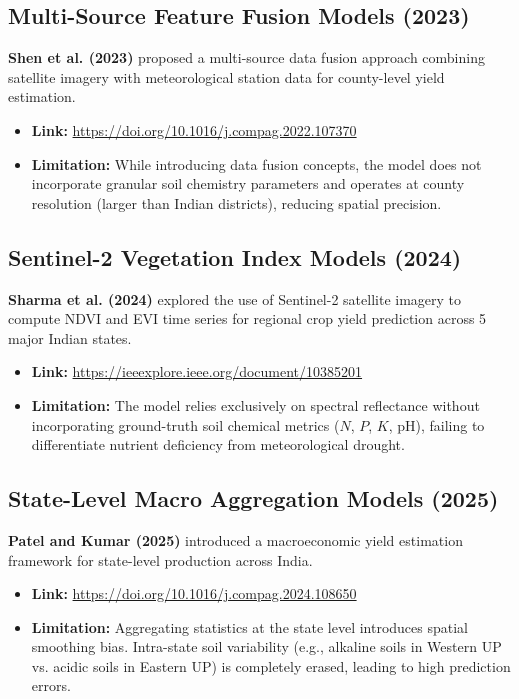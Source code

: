 \documentclass[11pt,a4paper]{article}
\begin{document}
\subsection{Multi-Source Feature Fusion Models (2023)}
\textbf{Shen et al. (2023)} \cite{shen2023multisource} proposed a multi-source data fusion approach combining satellite imagery with meteorological station data for county-level yield estimation.
\begin{itemize}
    \item \textbf{Link:} \url{https://doi.org/10.1016/j.compag.2022.107370}
    \item \textbf{Limitation:} While introducing data fusion concepts, the model does not incorporate granular soil chemistry parameters and operates at county resolution (larger than Indian districts), reducing spatial precision.
\end{itemize}

\subsection{Sentinel-2 Vegetation Index Models (2024)}
\textbf{Sharma et al. (2024)} \cite{sharma2024remote} explored the use of Sentinel-2 satellite imagery to compute NDVI and EVI time series for regional crop yield prediction across 5 major Indian states.
\begin{itemize}
    \item \textbf{Link:} \url{https://ieeexplore.ieee.org/document/10385201}
    \item \textbf{Limitation:} The model relies exclusively on spectral reflectance without incorporating ground-truth soil chemical metrics ($N$, $P$, $K$, pH), failing to differentiate nutrient deficiency from meteorological drought.
\end{itemize}

\subsection{State-Level Macro Aggregation Models (2025)}
\textbf{Patel and Kumar (2025)} \cite{patel2025state} introduced a macroeconomic yield estimation framework for state-level production across India.
\begin{itemize}
    \item \textbf{Link:} \url{https://doi.org/10.1016/j.compag.2024.108650}
    \item \textbf{Limitation:} Aggregating statistics at the state level introduces spatial smoothing bias. Intra-state soil variability (e.g., alkaline soils in Western UP vs. acidic soils in Eastern UP) is completely erased, leading to high prediction errors.
\end{itemize}
\end{document}
